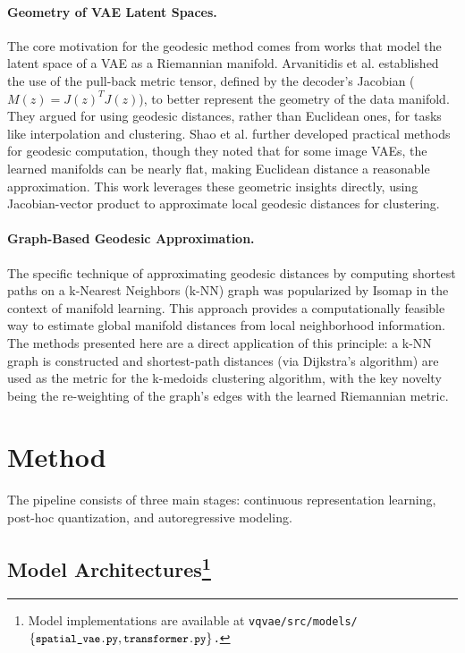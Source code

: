 \documentclass{article}
\begin{document}
\paragraph{Geometry of VAE Latent Spaces.} The core motivation for the geodesic method comes from works that model the latent space of a VAE as a Riemannian manifold. Arvanitidis et al. \cite{arvanitidis2017latent} established the use of the pull-back metric tensor, defined by the decoder's Jacobian ($M(z) = J(z)^T J(z)$), to better represent the geometry of the data manifold. They argued for using geodesic distances, rather than Euclidean ones, for tasks like interpolation and clustering. Shao et al. \cite{shao2018riemannian} further developed practical methods for geodesic computation, though they noted that for some image VAEs, the learned manifolds can be nearly flat, making Euclidean distance a reasonable approximation. 
This work leverages these geometric insights directly, using Jacobian-vector product to approximate local geodesic distances for clustering.

\paragraph{Graph-Based Geodesic Approximation.} The specific technique of approximating geodesic distances by computing shortest paths on a k-Nearest Neighbors (k-NN) graph was popularized by Isomap \cite{tenenbaum2000global} in the context of manifold learning. This approach provides a computationally feasible way to estimate global manifold distances from local neighborhood information. The methods presented here are a direct application of this principle: a k-NN graph is constructed and shortest-path distances (via Dijkstra's algorithm) are used as the metric for the k-medoids clustering algorithm, with the key novelty being the re-weighting of the graph's edges with the learned Riemannian metric.

\section{Method}
The pipeline consists of three main stages: continuous representation learning, post-hoc quantization, and autoregressive modeling.

\subsection{Model Architectures\protect\footnote{Model implementations are available at \texttt{vqvae/src/models/$\footnotesize\{\texttt{spatial\_vae.py}, \texttt{transformer.py}\}$.}}}
\end{document}
